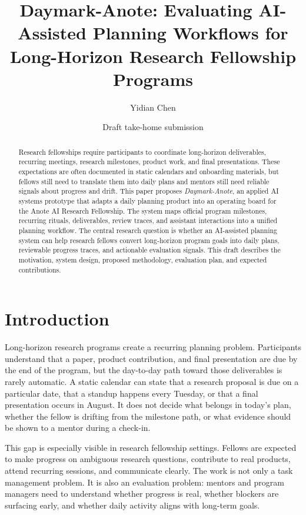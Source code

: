 \documentclass[11pt]{article}
\title{\textbf{Daymark-Anote: Evaluating AI-Assisted Planning Workflows for Long-Horizon Research Fellowship Programs}}
\author{Yidian Chen}
\date{Draft take-home submission}
\begin{document}
\maketitle

\begin{abstract}
Research fellowships require participants to coordinate long-horizon deliverables, recurring meetings, research milestones, product work, and final presentations. These expectations are often documented in static calendars and onboarding materials, but fellows still need to translate them into daily plans and mentors still need reliable signals about progress and drift. This paper proposes \textit{Daymark-Anote}, an applied AI systems prototype that adapts a daily planning product into an operating board for the Anote AI Research Fellowship. The system maps official program milestones, recurring rituals, deliverables, review traces, and assistant interactions into a unified planning workflow. The central research question is whether an AI-assisted planning system can help research fellows convert long-horizon program goals into daily plans, reviewable progress traces, and actionable evaluation signals. This draft describes the motivation, system design, proposed methodology, evaluation plan, and expected contributions.
\end{abstract}

\section{Introduction}

Long-horizon research programs create a recurring planning problem. Participants understand that a paper, product contribution, and final presentation are due by the end of the program, but the day-to-day path toward those deliverables is rarely automatic. A static calendar can state that a research proposal is due on a particular date, that a standup happens every Tuesday, or that a final presentation occurs in August. It does not decide what belongs in today's plan, whether the fellow is drifting from the milestone path, or what evidence should be shown to a mentor during a check-in.

This gap is especially visible in research fellowship settings. Fellows are expected to make progress on ambiguous research questions, contribute to real products, attend recurring sessions, and communicate clearly. The work is not only a task management problem. It is also an evaluation problem: mentors and program managers need to understand whether progress is real, whether blockers are surfacing early, and whether daily activity aligns with long-term goals.
\end{document}
